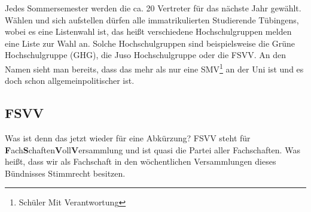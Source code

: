 Jedes Sommersemester werden die ca. 20 Vertreter für das nächste Jahr gewählt.
Wählen und sich aufstellen dürfen alle immatrikulierten Studierende Tübingens,
wobei es eine Listenwahl ist, das heißt verschiedene
Hochschulgruppen melden eine Liste zur Wahl an. Solche Hochschulgruppen
sind beispielsweise die Grüne Hochschulgruppe (GHG), die Juso Hochschulgruppe
oder die FSVV. An den Namen sieht man bereits, dass das mehr als nur eine
SMV\footnote{Schüler Mit Verantwortung} an der Uni ist und es doch schon
allgemeinpolitischer ist.



\subsection{FSVV}
Was ist denn das jetzt wieder für eine Abkürzung? FSVV steht
für \textbf{F}ach\textbf{S}chaften\textbf{V}oll\textbf{V}ersammlung und ist
quasi die Partei aller Fachschaften. Was heißt, dass wir als Fachschaft in den
wöchentlichen Versammlungen dieses Bündnisses Stimmrecht besitzen.


